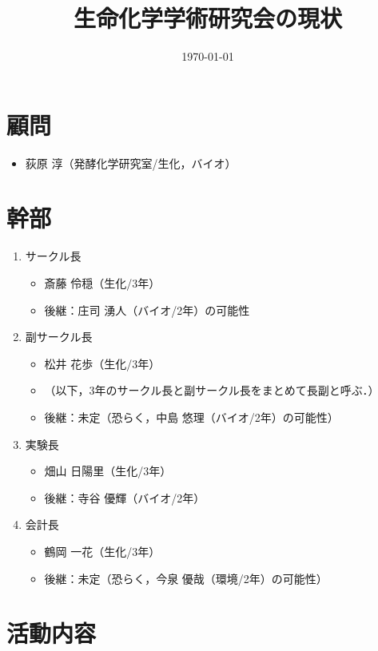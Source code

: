 \documentclass[a4paper,11pt,titlepage]{ltjsarticle}
\title{生命化学学術研究会の現状}
\author{\today}
\date{}
\begin{document}
\maketitle

\section{顧問}
\begin{itemize}
    \item 荻原 淳（発酵化学研究室/生化，バイオ）
\end{itemize}

\section{幹部}

\begin{enumerate}
    \item サークル長
    \begin{itemize}
        \item 斎藤 伶穏（生化/3年）
        \item 後継：庄司 湧人（バイオ/2年）の可能性
    \end{itemize}
    \item 副サークル長
    \begin{itemize}
        \item 松井 花歩（生化/3年）
        \item （以下，3年のサークル長と副サークル長をまとめて長副と呼ぶ．）
        \item 後継：未定（恐らく，中島 悠理（バイオ/2年）の可能性）
    \end{itemize}
    \item 実験長
    \begin{itemize}
        \item 畑山 日陽里（生化/3年）
        \item 後継：寺谷 優輝（バイオ/2年）
    \end{itemize}
    \item 会計長
    \begin{itemize}
        \item 鶴岡 一花（生化/3年）
        \item 後継：未定（恐らく，今泉 優哉（環境/2年）の可能性）
    \end{itemize}
\end{enumerate}

\section{活動内容}
\end{document}
